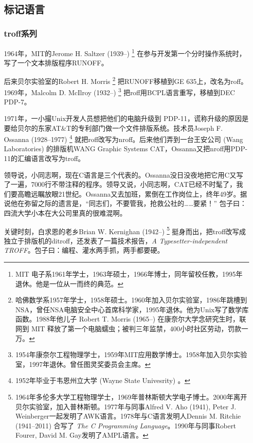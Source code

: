 \subsection{标记语言}

\subsubsection{troff系列}

1964年，MIT的Jerome H. Saltzer (1939--)\indexSaltzer{} \footnote{MIT 电子系1961年学士，1963年硕士，1966年博士，同年留校任教，1995年退休。他是一位从一而终的典范。} 在参与开发第一个分时操作系统时，写了一个文本排版程序RUNOFF。

后来贝尔实验室\indexBell 的Robert H. Morris\indexMorris{} \footnote{哈佛数学系1957年学士，1958年硕士。1960年加入贝尔实验室，1986年跳槽到NSA，曾任NSA电脑安全中心首席科学家，1995年退休。他为Unix写了数学库函数。1988年他儿子 Robert T. Morris (1965--) 在康奈尔大学念研究生时，联网到 MIT 释放了第一个电脑蠕虫；被判三年监禁，400小时社区劳动，罚款一万。} 把RUNOFF移植到GE 635上，改名为roff。1969年，Malcolm D. McIlroy (1932--)\indexMcIlroy{} \footnote{1954年康奈尔工程物理学士，1959年MIT应用数学博士。1958年加入贝尔实验室，1997年退休。曾任图灵奖委员会主席。} 把roff用BCPL语言重写，移植到DEC\indexDEC{} PDP-7。

1971年，一小撮Unix开发人员想把他们的电脑升级到 PDP-11，谎称升级的原因是要给贝尔的东家AT\&T\indexATT 的专利部门做一个文件排版系统。技术员Joseph F. Ossanna (1928--1977)\indexOssanna{} \footnote{1952年毕业于韦恩州立大学 (Wayne State Univesrity) 。} 就把roff改写为nroff。后来他们弄到一台王安公司 (Wang Laboratories)\indexWangLabs{} 的排版机WANG Graphic Systems CAT，Ossanna又把nroff用PDP-11的汇编语言改写为troff。

领导说，小同志啊，现在C语言是三个代表的。Ossanna没日没夜地把它用C又写了一遍，7000行不带注释的程序。领导又说，小同志啊，CAT已经不时髦了，我们要高瞻远瞩放眼21世纪。Ossanna又去加班，累倒在工作岗位上，终年49岁。据说他在弥留之际的遗言是，“同志们，不要管我，抢救公社的……要紧！” 包子曰：四流大学小本在大公司里真的很难混啊。

关键时刻，白求恩的老乡Brian W. Kernighan (1942--)\indexKernighan{} \footnote{1964年多伦多大学工程物理学士，1969年普林斯顿大学电子博士。2000年离开贝尔实验室，加入普林斯顿。1977年与同事Alfred V. Aho (1941), Peter J. Weinberger一起发明了AWK语言。1978年与C语言发明人Dennis M. Ritchie (1941--2011) 合写了 \emph{The C Programming Language}。1990年与同事Robert Fourer, David M. Gay发明了AMPL语言。} 挺身而出，把troff改写成独立于排版机的ditroff，还发表了一篇技术报告，\emph{A Typesetter-independent TROFF}。包子曰：编程、灌水两手抓，两手都要硬。

